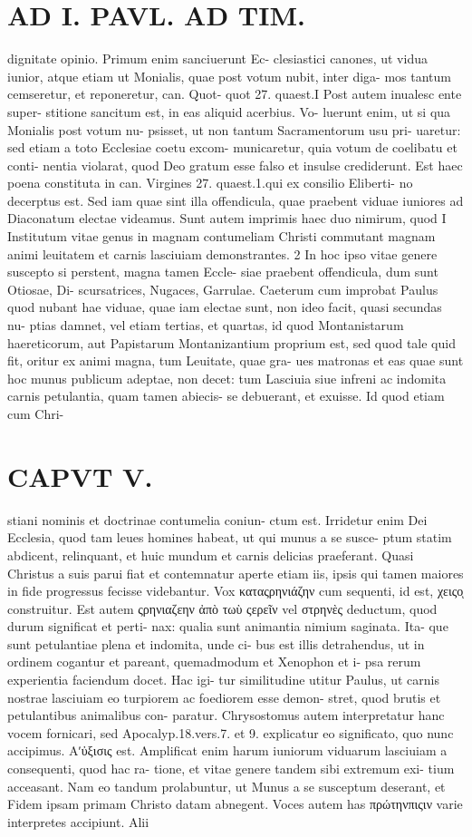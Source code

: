 \documentclass{article}
\begin{document}
\begin{pages}
\section*{AD I. PAVL. AD TIM. }
\marginpar{[ p.262 ]}dignitate opinio. Primum enim sanciuerunt Ec- clesiastici canones, ut vidua iunior, atque etiam ut Monialis, quae post votum nubit, inter diga- mos tantum cemseretur, et reponeretur, can. Quot- quot 27. quaest.I Post autem inualesc ente super- stitione sancitum est, in eas aliquid acerbius. Vo- luerunt enim, ut si qua Monialis post votum nu- psisset, ut non tantum Sacramentorum usu pri- uaretur: sed etiam a toto Ecclesiae coetu excom- municaretur, quia votum de coelibatu et conti- nentia violarat, quod Deo gratum esse falso et insulse crediderunt. Est haec poena constituta in can. Virgines 27. quaest.1.qui ex consilio Eliberti- no decerptus est. Sed iam quae sint illa offendicula, quae praebent viduae iuniores ad Diaconatum electae videamus. Sunt autem imprimis haec duo nimirum, quod I Institutum vitae genus in magnam contumeliam Christi commutant magnam animi leuitatem et carnis lasciuiam demonstrantes. 2 In hoc ipso vitae genere suscepto si perstent, magna tamen Eccle- siae praebent offendicula, dum sunt Otiosae, Di- scursatrices, Nugaces, Garrulae. Caeterum cum improbat Paulus quod nubant hae viduae, quae iam electae sunt, non ideo facit, quasi secundas nu- ptias damnet, vel etiam tertias, et quartas, id quod Montanistarum haereticorum, aut Papistarum Montanizantium proprium est, sed quod tale quid fit, oritur ex animi magna, tum Leuitate, quae gra- ues matronas et eas quae sunt hoc munus publicum adeptae, non decet: tum Lasciuia siue infreni ac indomita carnis petulantia, quam tamen abiecis- se debuerant, et exuisse. Id quod etiam cum Chri- 
\section*{CAPVT V. }
\marginpar{[ p.283 ]}stiani nominis et doctrinae contumelia coniun- ctum est. Irridetur enim Dei Ecclesia, quod tam leues homines habeat, ut qui munus a se susce- ptum statim abdicent, relinquant, et huic mundum et carnis delicias praeferant. Quasi Christus a suis parui fiat et contemnatur aperte etiam iis, ipsis qui tamen maiores in fide progressus fecisse videbantur. Vox καταςρηνιάζην cum sequenti, id est, χειςοͅ construitur. Est autem ςρηνιαζεην ἀπὸ τωὺ ςερεῖν vel στρηνὲς deductum, quod durum significat et perti- nax: qualia sunt animantia nimium saginata. Ita- que sunt petulantiae plena et indomita, unde ci- bus est illis detrahendus, ut in ordinem cogantur et pareant, quemadmodum et Xenophon et i- psa rerum experientia faciendum docet. Hac igi- tur similitudine utitur Paulus, ut carnis nostrae lasciuiam eo turpiorem ac foediorem esse demon- stret, quod brutis et petulantibus animalibus con- paratur. Chrysostomus autem interpretatur hanc vocem fornicari, sed Apocalyp.18.vers.7. et 9. explicatur eo significato, quo nunc accipimus.   Αʹὐξισις est. Amplificat enim harum iuniorum viduarum lasciuiam a consequenti, quod hac ra- tione, et vitae genere tandem sibi extremum exi- tium acceasant. Nam eo tandum prolabuntur, ut Munus a se susceptum deserant, et Fidem ipsam primam Christo datam abnegent. Voces autem has πρώτηνπιςιν varie interpretes accipiunt. Alii 

\end{pages}
\end{document}
